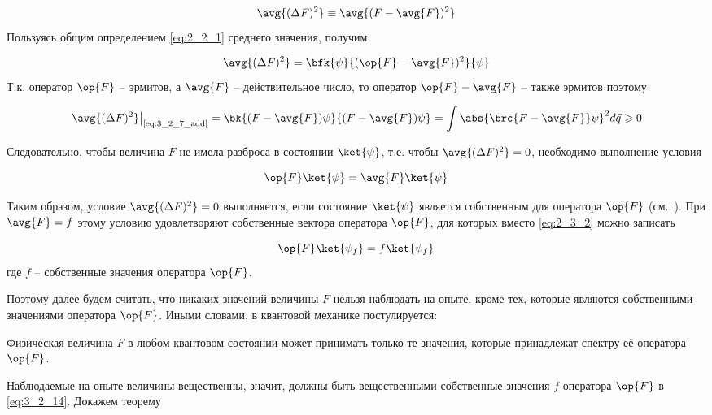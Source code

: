 \begin{equation}
\label{eq:3_2_10}
\avg{(\Delta F)^2} \equiv \avg{(F - \avg{F})^2}
\end{equation}%
%
Пользуясь общим определением \eqref{eq:2_2_1} среднего значения, получим

\begin{equation}
\label{eq:3_2_11}
\avg{(\Delta F)^2} = \bfk{\psi}{(\op{F} - \avg{F})^2}{\psi}
\end{equation}%
%
Т.к. оператор $\op{F}$ -- эрмитов, а $\avg{F}$ -- действительное число, то оператор $\op{F} - \avg{F}$ -- также эрмитов поэтому

\begin{equation}
\label{eq:3_2_12}
\left. \avg{(\Delta F)^2} \right|_{\text{\eqref{eq:3_2_7_add}}} =
  \bk{(F - \avg{F})\psi}{(F - \avg{F})\psi} =
  \int \abs{\brc{F - \avg{F}}\psi}^2 d\vec{q} \geqslant 0
\end{equation}

Следовательно, чтобы величина $F$ не имела разброса в состоянии $\ket{\psi}$, т.е. чтобы $\avg{(\Delta F)^2} = 0$, необходимо выполнение условия

\begin{equation}
\label{eq:3_2_13}
\op{F}\ket{\psi} = \avg{F}\ket{\psi}
\end{equation}

Таким образом, условие $\avg{(\Delta F)^2} = 0$ выполняется, если состояние $\ket{\psi}$ является собственным для оператора $\op{F}$ (см.~). При $\avg{F} = f$ этому условию удовлетворяют собственные вектора оператора $\op{F}$, для которых вместо \eqref{eq:2_3_2} можно записать

\begin{equation}
\label{eq:3_2_14}
\op{F}\ket{\psi_{f}} = f \ket{\psi_{f}}
\end{equation}%
%
где $f$ -- собственные значения оператора $\op{F}$.

Поэтому далее будем считать, что никаких значений величины $F$ нельзя наблюдать на опыте, кроме тех, которые являются собственными значениями оператора $\op{F}$. Иными словами, в квантовой механике постулируется:
\begin{stmt}
Физическая величина $F$ в любом квантовом состоянии может принимать только те значения, которые принадлежат спектру её оператора $\op{F}$.
\end{stmt}

Наблюдаемые на опыте величины вещественны, значит, должны быть вещественными собственные значения $f$ оператора $\op{F}$ в \eqref{eq:3_2_14}. Докажем теорему

